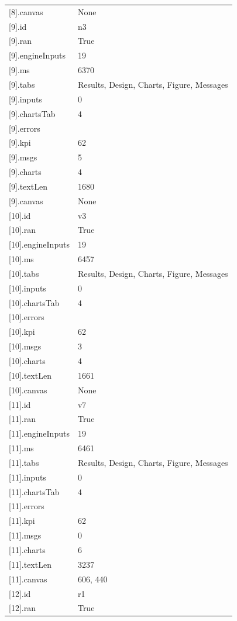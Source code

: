 {\begin{longtable}{p{}p{}}
{}[8].canvas & None\\
{}[9].id & n3\\
{}[9].ran & True\\
{}[9].engineInputs & 19\\
{}[9].ms & 6370\\
{}[9].tabs & Results, Design, Charts, Figure, Messages\\
{}[9].inputs & 0\\
{}[9].chartsTab & 4\\
{}[9].errors & \\
{}[9].kpi & 62\\
{}[9].msgs & 5\\
{}[9].charts & 4\\
{}[9].textLen & 1680\\
{}[9].canvas & None\\
{}[10].id & v3\\
{}[10].ran & True\\
{}[10].engineInputs & 19\\
{}[10].ms & 6457\\
{}[10].tabs & Results, Design, Charts, Figure, Messages\\
{}[10].inputs & 0\\
{}[10].chartsTab & 4\\
{}[10].errors & \\
{}[10].kpi & 62\\
{}[10].msgs & 3\\
{}[10].charts & 4\\
{}[10].textLen & 1661\\
{}[10].canvas & None\\
{}[11].id & v7\\
{}[11].ran & True\\
{}[11].engineInputs & 19\\
{}[11].ms & 6461\\
{}[11].tabs & Results, Design, Charts, Figure, Messages\\
{}[11].inputs & 0\\
{}[11].chartsTab & 4\\
{}[11].errors & \\
{}[11].kpi & 62\\
{}[11].msgs & 0\\
{}[11].charts & 6\\
{}[11].textLen & 3237\\
{}[11].canvas & 606, 440\\
{}[12].id & r1\\
{}[12].ran & True\\

\end{longtable}}
